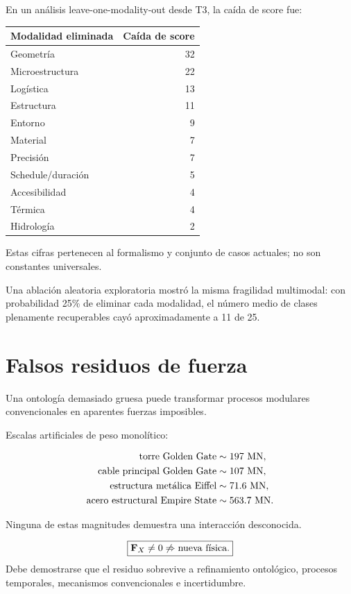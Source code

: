 En un análisis leave-one-modality-out desde T3, la caída de score fue:

\begin{center}
\begin{tabular}{lr}
\toprule
Modalidad eliminada & Caída de score \\
\midrule
Geometría & 32 \\
Microestructura & 22 \\
Logística & 13 \\
Estructura & 11 \\
Entorno & 9 \\
Material & 7 \\
Precisión & 7 \\
Schedule/duración & 5 \\
Accesibilidad & 4 \\
Térmica & 4 \\
Hidrología & 2 \\
\bottomrule
\end{tabular}
\end{center}

Estas cifras pertenecen al formalismo y conjunto de casos actuales; no son constantes universales.

Una ablación aleatoria exploratoria mostró la misma fragilidad multimodal: con probabilidad 25\% de eliminar cada modalidad, el número medio de clases plenamente recuperables cayó aproximadamente a 11 de 25.

\section{Falsos residuos de fuerza}

Una ontología demasiado gruesa puede transformar procesos modulares convencionales en aparentes fuerzas imposibles.

Escalas artificiales de peso monolítico:

\begin{align}
\text{torre Golden Gate} &\sim197\ {\rm MN},\\
\text{cable principal Golden Gate} &\sim107\ {\rm MN},\\
\text{estructura metálica Eiffel} &\sim71.6\ {\rm MN},\\
\text{acero estructural Empire State} &\sim563.7\ {\rm MN}.
\end{align}

Ninguna de estas magnitudes demuestra una interacción desconocida.

\begin{principle}
\begin{equation}
\boxed{
\mathbf F_X\neq0
\not\Rightarrow
\text{nueva física}.
}
\end{equation}
Debe demostrarse que el residuo sobrevive a refinamiento ontológico, procesos temporales, mecanismos convencionales e incertidumbre.
\end{principle}

